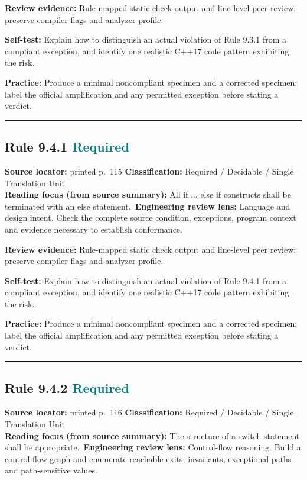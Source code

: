 \documentclass[10pt,letterpaper]{article}
\begin{document}
\textbf{Review evidence:} Rule-mapped static check output and line-level peer review; preserve compiler flags and analyzer profile.

\textbf{Self-test:} Explain how to distinguish an actual violation of Rule 9.3.1 from a compliant exception, and identify one realistic C++17 code pattern exhibiting the risk.\par
\textbf{Practice:} Produce a minimal noncompliant specimen and a corrected specimen; label the official amplification and any permitted exception before stating a verdict.
\smallskip\hrule\smallskip
\subsection*{Rule 9.4.1 \enspace \texorpdfstring{\small\textcolor{teal}{Required}}{Required}}
\noindent\textbf{Source locator:} printed p.~115 \quad\textbf{Classification:} Required / Decidable / Single Translation Unit\\
\textbf{Reading focus (from source summary):} All if ... else if constructs shall be terminated with an else statement.\
\textbf{Engineering review lens:} Language and design intent. Check the complete source condition, exceptions, program context and evidence necessary to establish conformance.

\textbf{Review evidence:} Rule-mapped static check output and line-level peer review; preserve compiler flags and analyzer profile.

\textbf{Self-test:} Explain how to distinguish an actual violation of Rule 9.4.1 from a compliant exception, and identify one realistic C++17 code pattern exhibiting the risk.\par
\textbf{Practice:} Produce a minimal noncompliant specimen and a corrected specimen; label the official amplification and any permitted exception before stating a verdict.
\smallskip\hrule\smallskip
\subsection*{Rule 9.4.2 \enspace \texorpdfstring{\small\textcolor{teal}{Required}}{Required}}
\noindent\textbf{Source locator:} printed p.~116 \quad\textbf{Classification:} Required / Decidable / Single Translation Unit\\
\textbf{Reading focus (from source summary):} The structure of a switch statement shall be appropriate.\
\textbf{Engineering review lens:} Control-flow reasoning. Build a control-flow graph and enumerate reachable exits, invariants, exceptional paths and path-sensitive values.
\end{document}
